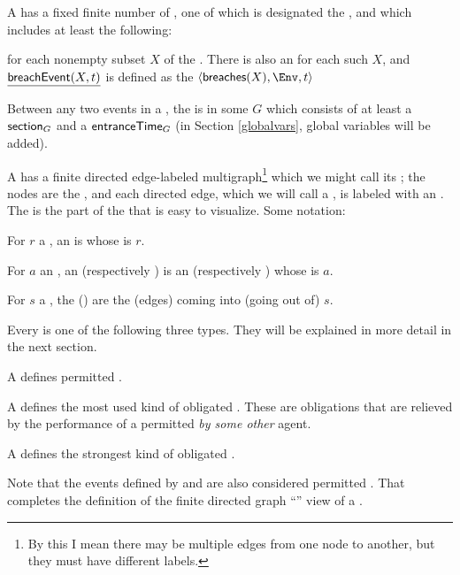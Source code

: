 \documentclass[12pt]{article}
\begin{document}
A \Contract has a fixed finite number of , one of which is designated the , and which includes at least the following:
\begin{LPPI}
\item {}
\item {} for each nonempty subset $X$ of the \Roles. There is also an \Action {} for each such $X$, and $\underline{\textsf{breachEvent}(X,t)}$ is defined as the \Event $\tup{\breaches{X}, \Env, t}$
\end{LPPI}
Between any two events in a \trace, the \Contract is in some  $G$ which consists of at least a \State $\textsf{section}_{G}$ and a \TimeStamp $\textsf{entranceTime}_{G}$ (in Section \ref{globalvars}, global variables will be added).

\medskip

A \Contract has a finite directed edge-labeled multigraph\footnote{By this I mean there may be multiple edges from one node to another, but they must have different labels.} which we might call its ; the nodes are the \States, and each directed edge, which we will call a , is labeled with an \Action. The \Map is the part of the \Contract that is easy to visualize. Some notation:

\begin{LPPI}
\item For $r$ a \Role, an  is \nameforaedge whose \Role is $r$.
\item For $a$ an \Action, an  (respectively ) is an \Event (respectively \connection) whose \Action is $a$.
\item For $s$ a \State, the  () are the \nameforedges (edges) coming into (going out of) $s$.
\end{LPPI}
Every \connection is one of the following three types. They will be explained in more detail in the next section.
\begin{LPPI}
\item A  defines permitted \Events.
\item A  defines the most used kind of obligated \Events. These are obligations that are relieved by the performance of a permitted {\Event} {\it by some other} agent.
\item A  defines the strongest kind of obligated \Events.
\end{LPPI}
Note that the events defined by \rmustntrans and \mustntrans are also considered permitted \Events. That completes the definition of the finite directed graph ``\Map'' view of a \Contract.
\end{document}
